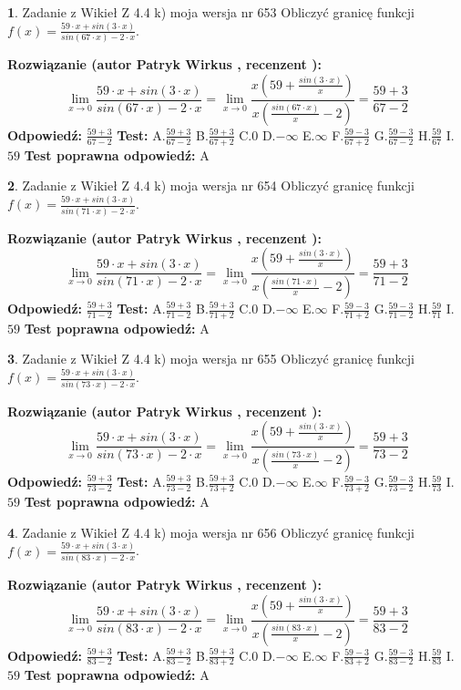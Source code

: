 \documentclass[12pt, a4paper]{article}
\theoremstyle{definition} %
\newtheorem{zad}{}
\newcommand{\zadStart}[1]{\begin{zad}#1\newline}
\newcommand{\zadStop}{\end{zad}}
\newcommand{\rozwStart}[2]{\noindent \textbf{Rozwiązanie (autor #1 , recenzent #2): }\newline}
\newcommand{\rozwStop}{\newline}
\newcommand{\odpStart}{\noindent \textbf{Odpowiedź:}\newline}
\newcommand{\odpStop}{\newline}
\newcommand{\testStart}{\noindent \textbf{Test:}\newline}
\newcommand{\testStop}{\newline}
\newcommand{\kluczStart}{\noindent \textbf{Test poprawna odpowiedź:}\newline}
\newcommand{\kluczStop}{\newline}
\begin{document}
\zadStart{Zadanie z Wikieł Z 4.4 k) moja wersja nr 653}
Obliczyć granicę funkcji $f(x)=\frac{59\cdot x +sin(3\cdot x)}{sin(67\cdot x) -2\cdot x}$.
\zadStop
\rozwStart{Patryk Wirkus}{}
$$\lim\limits_{x\to 0}\frac{59\cdot x +sin(3\cdot x)}{sin(67\cdot x) -2\cdot x}
=\lim\limits_{x\to 0}\frac{x(59+\frac{sin(3\cdot x)}{x})}{x(\frac{sin(67\cdot x)}{x}-2)}
=\frac{59+3}{67-2}$$
\rozwStop
\odpStart
$\frac{59+3}{67-2}$
\odpStop
\testStart
A.$\frac{59+3}{67-2}$
B.$\frac{59+3}{67+2}$
C.$0$
D.$-\infty$
E.$\infty$
F.$\frac{59-3}{67+2}$
G.$\frac{59-3}{67-2}$
H.$\frac{59}{67}$
I.$59$
\testStop
\kluczStart
A
\kluczStop



\zadStart{Zadanie z Wikieł Z 4.4 k) moja wersja nr 654}
Obliczyć granicę funkcji $f(x)=\frac{59\cdot x +sin(3\cdot x)}{sin(71\cdot x) -2\cdot x}$.
\zadStop
\rozwStart{Patryk Wirkus}{}
$$\lim\limits_{x\to 0}\frac{59\cdot x +sin(3\cdot x)}{sin(71\cdot x) -2\cdot x}
=\lim\limits_{x\to 0}\frac{x(59+\frac{sin(3\cdot x)}{x})}{x(\frac{sin(71\cdot x)}{x}-2)}
=\frac{59+3}{71-2}$$
\rozwStop
\odpStart
$\frac{59+3}{71-2}$
\odpStop
\testStart
A.$\frac{59+3}{71-2}$
B.$\frac{59+3}{71+2}$
C.$0$
D.$-\infty$
E.$\infty$
F.$\frac{59-3}{71+2}$
G.$\frac{59-3}{71-2}$
H.$\frac{59}{71}$
I.$59$
\testStop
\kluczStart
A
\kluczStop



\zadStart{Zadanie z Wikieł Z 4.4 k) moja wersja nr 655}
Obliczyć granicę funkcji $f(x)=\frac{59\cdot x +sin(3\cdot x)}{sin(73\cdot x) -2\cdot x}$.
\zadStop
\rozwStart{Patryk Wirkus}{}
$$\lim\limits_{x\to 0}\frac{59\cdot x +sin(3\cdot x)}{sin(73\cdot x) -2\cdot x}
=\lim\limits_{x\to 0}\frac{x(59+\frac{sin(3\cdot x)}{x})}{x(\frac{sin(73\cdot x)}{x}-2)}
=\frac{59+3}{73-2}$$
\rozwStop
\odpStart
$\frac{59+3}{73-2}$
\odpStop
\testStart
A.$\frac{59+3}{73-2}$
B.$\frac{59+3}{73+2}$
C.$0$
D.$-\infty$
E.$\infty$
F.$\frac{59-3}{73+2}$
G.$\frac{59-3}{73-2}$
H.$\frac{59}{73}$
I.$59$
\testStop
\kluczStart
A
\kluczStop



\zadStart{Zadanie z Wikieł Z 4.4 k) moja wersja nr 656}
Obliczyć granicę funkcji $f(x)=\frac{59\cdot x +sin(3\cdot x)}{sin(83\cdot x) -2\cdot x}$.
\zadStop
\rozwStart{Patryk Wirkus}{}
$$\lim\limits_{x\to 0}\frac{59\cdot x +sin(3\cdot x)}{sin(83\cdot x) -2\cdot x}
=\lim\limits_{x\to 0}\frac{x(59+\frac{sin(3\cdot x)}{x})}{x(\frac{sin(83\cdot x)}{x}-2)}
=\frac{59+3}{83-2}$$
\rozwStop
\odpStart
$\frac{59+3}{83-2}$
\odpStop
\testStart
A.$\frac{59+3}{83-2}$
B.$\frac{59+3}{83+2}$
C.$0$
D.$-\infty$
E.$\infty$
F.$\frac{59-3}{83+2}$
G.$\frac{59-3}{83-2}$
H.$\frac{59}{83}$
I.$59$
\testStop
\kluczStart
A
\kluczStop
\end{document}
